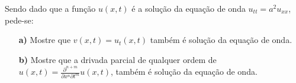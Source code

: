 \linespread{1.5}
Sendo dado que a função $u(x,t)$ é a solução da equação de onda $u_{tt} = a^2u_{xx}$, pede-se:
\begin{itemize}
    \item[\textbf{a)}] Mostre que $v(x,t) = u_t(x,t)$ também é solução da equação de onda.
    \item[\textbf{b)}] Mostre que a drivada parcial de qualquer ordem de $u(x,t) = \frac{\partial^{n+m}}{\partial x^n \partial t^m}u(x,t)$, também é solução da equação de onda.
\end{itemize}